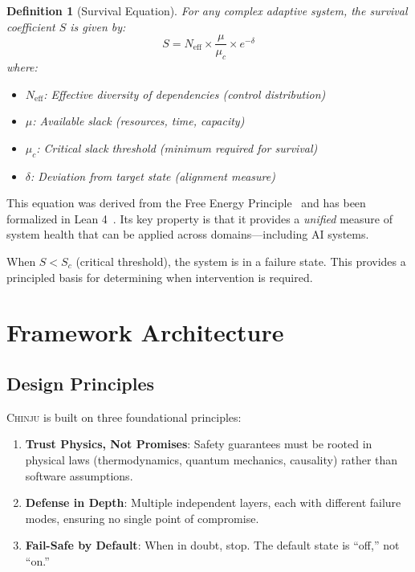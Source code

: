 \documentclass[11pt,a4paper]{article}
\newtheorem{definition}{Definition}
\newcommand{\chinju}{\textsc{Chinju}}
\newcommand{\Neff}{N_{\text{eff}}}
\newcommand{\muc}{\mu_c}
\begin{document}
\begin{definition}[Survival Equation]
\label{def:survival_equation}
For any complex adaptive system, the survival coefficient $S$ is given by:
\begin{equation}
S = \Neff \times \frac{\mu}{\muc} \times e^{-\delta}
\label{eq:survival}
\end{equation}
where:
\begin{itemize}
    \item $\Neff$: Effective diversity of dependencies (control distribution)
    \item $\mu$: Available slack (resources, time, capacity)
    \item $\muc$: Critical slack threshold (minimum required for survival)
    \item $\delta$: Deviation from target state (alignment measure)
\end{itemize}
\end{definition}

This equation was derived from the Free Energy Principle~\cite{friston2010free} and has been formalized in Lean 4~\cite{ugentropy_lean}.
Its key property is that it provides a \emph{unified} measure of system health that can be applied across domains---including AI systems.

When $S < S_c$ (critical threshold), the system is in a failure state.
This provides a principled basis for determining when intervention is required.

\section{Framework Architecture}
\label{sec:architecture}

\subsection{Design Principles}

\chinju{} is built on three foundational principles:

\begin{enumerate}
    \item \textbf{Trust Physics, Not Promises}: Safety guarantees must be rooted in physical laws (thermodynamics, quantum mechanics, causality) rather than software assumptions.

    \item \textbf{Defense in Depth}: Multiple independent layers, each with different failure modes, ensuring no single point of compromise.

    \item \textbf{Fail-Safe by Default}: When in doubt, stop. The default state is ``off,'' not ``on.''
\end{enumerate}
\end{document}

